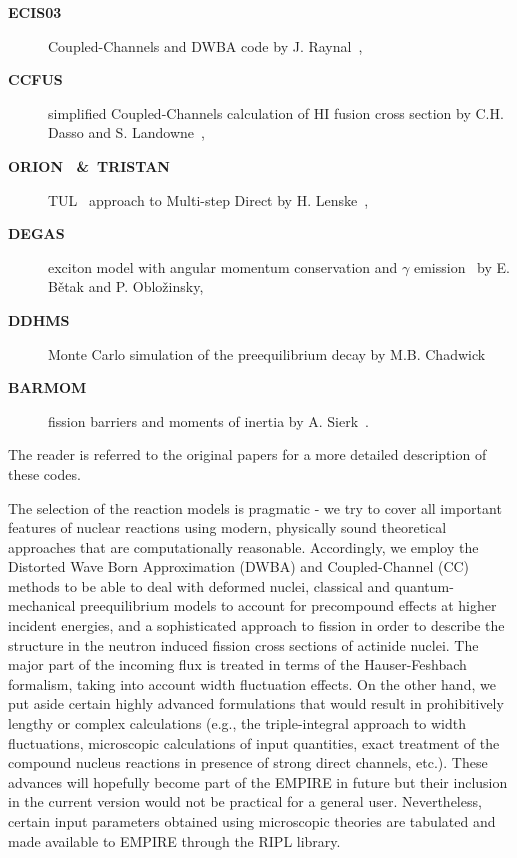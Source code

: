 \begin{description}
\item[\textbf{ECIS03%
}] Coupled-Channels and DWBA code by J. Raynal~\cite{ECIS},

\item[\textbf{CCFUS%
}] simplified Coupled-Channels calculation of HI fusion cross section by C.H. Dasso and S. Landowne~\cite{CCFUS},

\item[\textbf{ORION%
~\&~TRISTAN%
}] TUL~\cite{TUL} approach to Multi-step Direct by H. Lenske~\cite{ORTRI},

\item[\textbf{DEGAS%
}] exciton model with angular momentum conservation and $\gamma $ emission~\cite{Degas} by E. B\v{e}tak and P. Oblo\v{z}insky,

\item[\textbf{DDHMS%
}] Monte Carlo simulation of the preequilibrium decay by M.B. Chadwick~\cite{DDHMScode}

\item[\textbf{BARMOM%
}] fission barriers and moments of inertia by A. Sierk~\cite{sierk}.
\end{description}

The reader is referred to the original papers for a more detailed
description of these codes.

The selection of the reaction models is pragmatic - we try to cover all
important features of nuclear reactions using modern, physically sound
theoretical approaches that are computationally reasonable. Accordingly, we
employ the Distorted Wave Born Approximation (DWBA) and Coupled-Channel (CC)
methods to be able to deal with deformed nuclei, classical and
quantum-mechanical preequilibrium models to account for precompound effects
at higher incident energies, and a sophisticated approach to fission in
order to describe the structure in the neutron induced fission cross sections of
actinide nuclei. The major part of the incoming flux is treated in terms of
the Hauser-Feshbach formalism, taking into account width fluctuation effects. On
the other hand, we put aside certain highly advanced formulations that would
result in prohibitively lengthy or complex calculations (e.g., the
triple-integral approach to width fluctuations, microscopic calculations of
input quantities, exact treatment of the compound nucleus reactions in
presence of strong direct channels, etc.). These advances will
hopefully become part of the EMPIRE in future but their inclusion in the
current version would not be practical for a general user. Nevertheless,
certain input parameters obtained using microscopic theories are tabulated
and made available to EMPIRE through the RIPL library.

